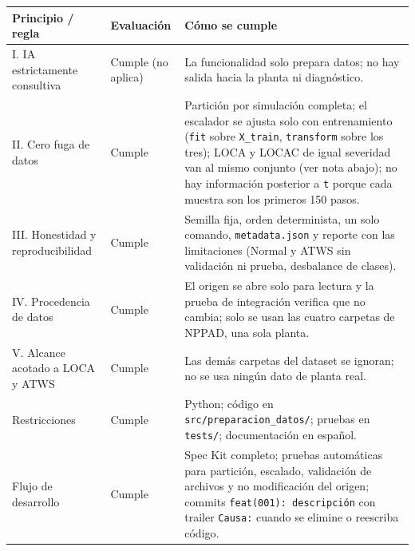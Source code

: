 \documentclass[12pt,a4paper]{article}
\newcounter{none} %
\newenvironment{documentogenerado}[2]{%
  \def\doccomando{#1}\def\docruta{#2}%
  \par\begingroup\small\setstretch{1.15}\sloppy%
}{\endgroup\par\medskip}
\begin{document}
\begin{documentogenerado}{/speckit-plan}{specs\slash 001-preparacion-datos\slash plan.md}
{\def\LTcaptype{none} %
\begin{longtable}[]{@{}
  >{\raggedright\arraybackslash\hspace{0pt}}p{}
  >{\raggedright\arraybackslash\hspace{0pt}}p{}
  >{\raggedright\arraybackslash\hspace{0pt}}p{}@{}}
\toprule\noalign{}
\begin{minipage}[b]{\linewidth}\raggedright
Principio / regla
\end{minipage} & \begin{minipage}[b]{\linewidth}\raggedright
Evaluación
\end{minipage} & \begin{minipage}[b]{\linewidth}\raggedright
Cómo se cumple
\end{minipage} \\
\midrule\noalign{}
\endhead
\bottomrule\noalign{}
\endlastfoot
I. IA estrictamente consultiva & Cumple (no aplica) & La funcionalidad solo prepara datos; no hay salida hacia la planta ni diagnóstico. \\
II. Cero fuga de datos & Cumple & Partición por simulación completa; el escalador se ajusta solo con entrenamiento (\texttt{fit} sobre \texttt{X\_\allowbreak{}train}, \texttt{transform} sobre los tres); LOCA y LOCAC de igual severidad van al mismo conjunto (ver nota abajo); no hay información posterior a \texttt{t} porque cada muestra son los primeros 150 pasos. \\
III. Honestidad y reproducibilidad & Cumple & Semilla fija, orden determinista, un solo comando, \texttt{metadata.\allowbreak{}json} y reporte con las limitaciones (Normal y ATWS sin validación ni prueba, desbalance de clases). \\
IV. Procedencia de datos & Cumple & El origen se abre solo para lectura y la prueba de integración verifica que no cambia; solo se usan las cuatro carpetas de NPPAD, una sola planta. \\
V. Alcance acotado a LOCA y ATWS & Cumple & Las demás carpetas del dataset se ignoran; no se usa ningún dato de planta real. \\
Restricciones & Cumple & Python; código en \texttt{src/\allowbreak{}preparacion\_\allowbreak{}datos/}; pruebas en \texttt{tests/}; documentación en español. \\
Flujo de desarrollo & Cumple & Spec Kit completo; pruebas automáticas para partición, escalado, validación de archivos y no modificación del origen; commits \texttt{feat(001):\ descripción} con trailer \texttt{Causa:} cuando se elimine o reescriba código. \\
\end{longtable}
}


\end{documentogenerado}
\end{document}
